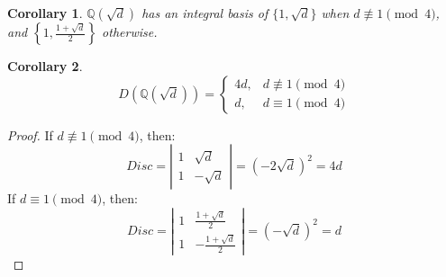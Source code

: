 \documentclass{article}
\newcommand{\Q}{\mathbb{Q}}
\newtheorem{cor}{Corollary}[subsection]
\begin{document}
      \begin{cor}
      $\Q(\sqrt{d})$ has an integral basis of $\{1,\sqrt{d}\}$ when $d\not\equiv 1\pmod{4}$, and $\left\{1,\frac{1+\sqrt{d}}{2}\right\}$ otherwise.
      \end{cor}
      \begin{cor}
      \begin{equation*}
          D(\Q(\sqrt{d}))=\begin{cases}
          4d, &d\not\equiv 1\pmod{4}\\
          d, &d\equiv 1\pmod{4}
          \end{cases}
      \end{equation*}
      \end{cor}
      \begin{proof}
      If $d\not\equiv 1\pmod{4}$, then:
      $$Disc = \left|\begin{array}{cc}
          1 & \sqrt{d} \\
          1 & -\sqrt{d}
      \end{array}\right|=(-2\sqrt{d})^2=4d$$
      If $d\equiv 1\pmod{4}$, then:
      $$Disc = \left|\begin{array}{cc}
          1 & \frac{1+\sqrt{d}}{2} \\
          1 & -\frac{1+\sqrt{d}}{2}
      \end{array}\right|=(-\sqrt{d})^2=d$$
      \end{proof}
\end{document}
